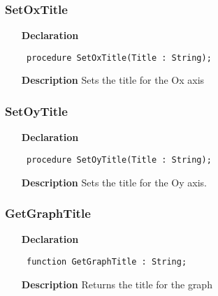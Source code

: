 \documentclass[12pt,a4paper,oneside]{report}
\newcommand{\declarationitem}[1]{\textbf{#1}}
\newcommand{\descriptiontitle}[1]{\textbf{#1}}
\newcommand{\code}[1]{\texttt{#1}}
\begin{document}
\subsubsection{SetOxTitle}
\label{uplot-SetOxTitle}
\begin{itemize}\item[\declarationitem{Declaration}\hfill]
	\begin{flushleft}
		\code{
			procedure SetOxTitle(Title : String);}
		
	\end{flushleft}
	
	\par
	\item[\descriptiontitle{Description}]
	Sets the title for the Ox axis
	
\end{itemize}
\subsubsection{SetOyTitle}
\label{uplot-SetOyTitle}
\begin{itemize}\item[\declarationitem{Declaration}\hfill]
	\begin{flushleft}
		\code{
			procedure SetOyTitle(Title : String);}
		
	\end{flushleft}
	
	\par
	\item[\descriptiontitle{Description}]
	Sets the title for the Oy axis.
	
\end{itemize}
\subsubsection{GetGraphTitle}
\label{uplot-GetGraphTitle}
\begin{itemize}\item[\declarationitem{Declaration}\hfill]
	\begin{flushleft}
		\code{
			function GetGraphTitle : String;}
		
	\end{flushleft}
	
	\par
	\item[\descriptiontitle{Description}]
	Returns the title for the graph
	
\end{itemize}
\end{document}
